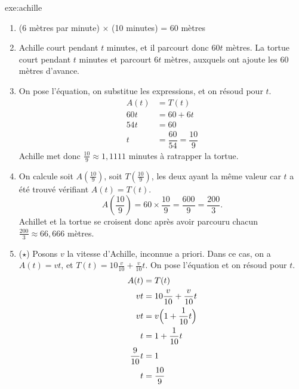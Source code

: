 {}{exe:achille}{
	\begin{enumerate}
		\item (6 mètres par minute) $\times$ (10 minutes) = 60 mètres
        	\item Achille court pendant $t$ minutes, et il parcourt donc $60t$ mètres.
        	La tortue court pendant $t$ minutes et parcourt $6t$ mètres, auxquels ont ajoute les 60 mètres d'avance.
        	\item On pose l'équation, on substitue les expressions, et on résoud pour $t$.
        		\begin{align*}
        			A(t) &= T(t) \\
        			60t &= 60 + 6t \\
        			54t &= 60 \\
        			t &= \dfrac{60}{54} = \dfrac{10}9
        		\end{align*}
		Achille met donc $\frac{10}9 \approx 1,1111$ minutes à ratrapper la tortue.
        	\item On calcule soit $A(\frac{10}9)$, soit $T(\frac{10}9)$, les deux ayant la même valeur car $t$ a été trouvé vérifiant $A(t) = T(t)$.
        		\[ A\left(\dfrac{10}9 \right) = 60 \times \dfrac{10}9 = \dfrac{600}{9} = \dfrac{200}3. \]
		Achillet et la tortue se croisent donc après avoir parcouru chacun $\frac{200}3 \approx 66,666$ mètres.
        	\item($\star$) 
        	Posons $v$ la vitesse d'Achille, inconnue a priori.
        	Dans ce cas, on a $A(t) = vt$, et $T(t)= 10\frac{v}{10} + \frac{v}{10}t$.
        	On pose l'équation et on résoud pour $t$.
        		\begin{align*}
        			A(t) &= T(t) \\
        			vt &= 10\dfrac{v}{10} + \dfrac{v}{10}t \\
        			vt &= v\Bigl( 1 + \dfrac1{10}t\Bigr) \\
        			t &= 1 + \dfrac1{10}t \\
        			\dfrac9{10} t &= 1 \\
        			t &= \dfrac{10}9
        		\end{align*}
        		
	\end{enumerate}
}


